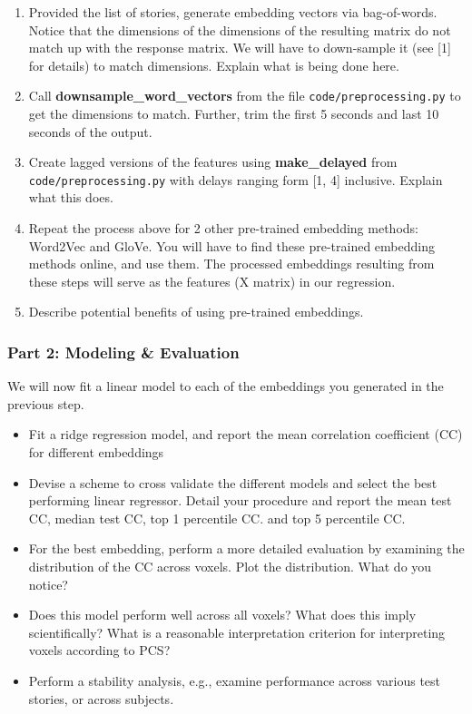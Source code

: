\documentclass[letterpaper,12pt]{article}
\begin{document}
\begin{enumerate}
    \item Provided the list of stories, generate embedding vectors via bag-of-words. Notice that the dimensions of the dimensions of the resulting matrix do not match up with the response matrix. We will have to down-sample it (see [1] for details) to match dimensions. Explain what is being done here.
    \item Call \textbf{downsample\_word\_vectors} from the file \texttt{code/preprocessing.py} to get the dimensions to match. Further, trim the first 5 seconds and last 10 seconds of the output.
    \item Create lagged versions of the features using \textbf{make\_delayed} from \texttt{code/preprocessing.py} with delays ranging form [1, 4] inclusive. Explain what this does.
    \item Repeat the process above for 2 other pre-trained embedding methods: Word2Vec and GloVe. You will have to find these pre-trained embedding methods online, and use them. The processed embeddings resulting from these steps will serve as the features (X matrix) in our regression.
    \item Describe potential benefits of using pre-trained embeddings.
\end{enumerate}

\subsubsection{Part 2: Modeling \& Evaluation}

\vspace{1em}
\noindent
We will now fit a linear model to each of the embeddings you generated in the previous step.
\begin{itemize}
    \item Fit a ridge regression model, and report the mean correlation coefficient (CC) for different embeddings
    \item Devise a scheme to cross validate the different models and select the best performing linear regressor. Detail your procedure and report the mean test CC, median test CC, top 1 percentile CC. and top 5 percentile CC.
    \item For the best embedding, perform a more detailed evaluation by examining the distribution of the CC across voxels. Plot the distribution. What do you notice?
    \item Does this model perform well across all voxels? What does this imply scientifically? What is a reasonable interpretation criterion for interpreting voxels according to PCS?
    \item Perform a stability analysis, e.g., examine performance across various test stories, or across subjects.
\end{itemize}
\end{document}

